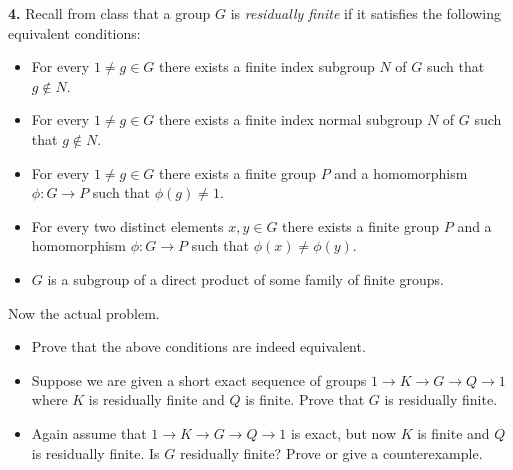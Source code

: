\documentclass[12pt]{amsart}
\begin{document}
{\bf 4.} Recall from class that a group $G$ is {\it residually finite} if it satisfies the following equivalent conditions:
\begin{itemize}
\item[(1)] For every $1\neq g\in G$ there exists a finite index subgroup $N$ of $G$ such that $g\not\in N$.
\item[(2)] For every $1\neq g\in G$ there exists a finite index normal subgroup $N$ of $G$ such that $g\not\in N$.
\item[(3)] For every $1\neq g\in G$ there exists a finite group $P$ and a homomorphism $\phi:G\to P$ such that
$\phi(g)\neq 1$.
\item[(3')] For every two distinct elements $x,y\in G$ there exists a finite group $P$ and a homomorphism $\phi:G\to P$ such that $\phi(x)\neq \phi(y)$.
\item[(4)] $G$ is a subgroup of a direct product of some family of finite groups.
\end{itemize}

Now the actual problem.

\begin{itemize}
\item[(a)] Prove that the above conditions are indeed equivalent.
\item[(b)] Suppose we are given a short exact sequence of groups $1\to K\to G\to Q\to 1$
where $K$ is residually finite and $Q$ is finite. Prove that $G$ is residually finite.
\item[(c)] Again assume that $1\to K\to G\to Q\to 1$ is exact, but now $K$ is finite and $Q$ is residually finite. Is $G$ residually finite? Prove or give a counterexample.
\end{itemize}
\end{document}
